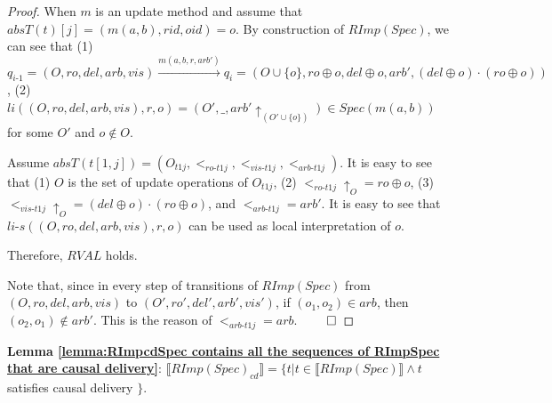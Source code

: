 \begin {proof}
When $m$ is an update method and assume that $absT(t)[j]=(m(a,b),rid,oid)=o$. By construction of $RImp(Spec)$, we can see that (1) $q_{\textit{i-1}} = (O,ro,del,arb,vis) {\xrightarrow{m(a,b,r,arb')}} q_i = (O \cup \{ o \},ro \oplus o ,del \oplus o,arb',(del \oplus o) \cdot (ro \oplus o))$, (2) $li((O,ro,del,arb,vis),r,o) = (O',\_,arb' \uparrow_{(O' \cup \{ o \})}) \in Spec(m(a,b))$ for some $O'$ and $o \notin O$.

Assume $absT(t[1,j]) = (O_\textit{t1j},<_{\textit{ro-t1j}},<_{\textit{vis-t1j}},<_{\textit{arb-t1j}})$. It is easy to see that (1) $O$ is the set of update operations of $O_\textit{t1j}$, (2) $<_{\textit{ro-t1j}} \uparrow_{O} = ro \oplus o$, (3) $<_{\textit{vis-t1j}} \uparrow_{O} = (del \oplus o) \cdot (ro \oplus o)$, and $<_{\textit{arb-t1j}} = arb'$. It is easy to see that $\textit{li-s}((O,ro,del,arb,vis),r,o)$ can be used as local interpretation of $o$.

Therefore, $\textit{RVAL}$ holds.

Note that, since in every step of transitions of $RImp(Spec)$ from $(O,ro,del,arb,vis)$ to $(O',ro',del',arb',vis')$, if $(o_1,o_2) \in arb$, then $(o_2,o_1) \notin arb'$. This is the reason of $<_{\textit{arb-t1j}} = arb$. $\qed$
\end {proof}



{\noindent \bf Lemma \ref{lemma:RImpcdSpec contains all the sequences of RImpSpec that are causal delivery}}: $\llbracket RImp(Spec)_{\textit{cd}} \rrbracket = \{ t \vert t \in \llbracket RImp(Spec) \rrbracket \wedge t$ satisfies causal delivery $\}$.

